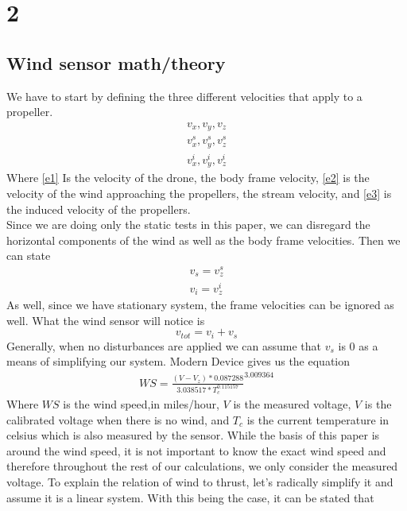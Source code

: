 \documentclass[conference]{IEEEtran}
\begin{document}
\section{2}
\subsection{Wind sensor math/theory}
We have to start by defining the three different velocities that apply to a propeller.\\
\begin{eqnarray}
\label{e1}
v_x , v_y , v_z \\
\label{e2}
v^s_{x} , v^s_{y} , v^s_{z} \\
\label{e3}
v^i_{x} , v^i_{y} , v^i_{z}
\end{eqnarray}
Where \ref{e1} Is the velocity of the drone, the body frame velocity, \ref{e2} is the velocity of the wind approaching the propellers, the stream velocity, and \ref{e3} is the induced velocity of the propellers.\\
Since we are doing only the static tests in this paper, we can disregard the horizontal components of the wind as well as the body frame velocities. Then we can state 
\begin{eqnarray}
\nonumber
v_s = v^s_{z}\\
\nonumber
v_i = v^i_{z}
\end{eqnarray}
As well, since we have stationary system, the frame velocities can be ignored as well. What the wind sensor will notice is 
\begin{equation}
v_{tot} = v_{i} + v_{s}
\label{vtot}
\end{equation}	
Generally, when no disturbances are applied we can assume that $v_s$ is $0$ as a means of simplifying our system.
Modern Device \cite{md} gives us the equation 
\begin{eqnarray}
WS = \frac{(V - V_{z})*0.087288}{3.038517 * T_{c} ^{0.115157}} ^ {3.009364}
\label{wind_speed}
\end{eqnarray}
Where $WS$ is the wind speed,in miles/hour, $V$ is the measured voltage, $V$ is the calibrated voltage when there is no wind, and $T_c$ is the current temperature in celsius which is also measured by the sensor. While the basis of this paper is around the wind speed, it is not important to know the exact wind speed and therefore throughout the rest of our calculations, we only consider the measured voltage. 
To explain the relation of wind to thrust, let's radically simplify it and assume it is a linear system.  With this being the case, it can be stated that 
\end{document}
